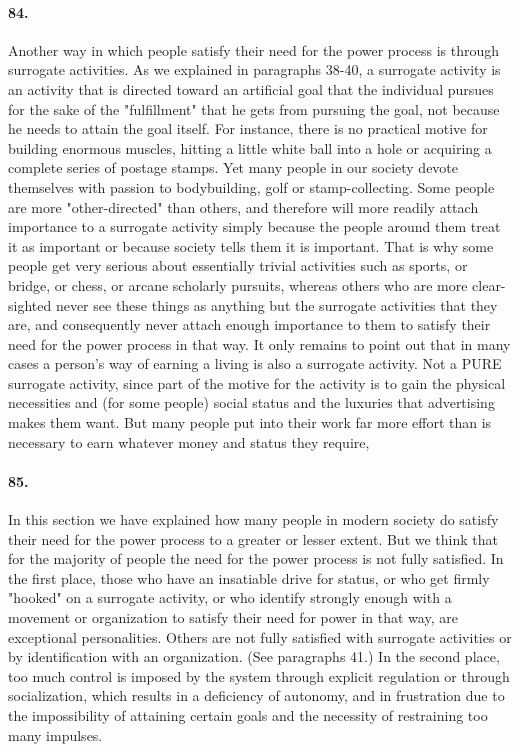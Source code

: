 \documentclass[12pt]{book}
\begin{document}
\paragraph{84.} Another way in which people satisfy their need for the power process is through surrogate activities. As we explained in paragraphs 38-40, a surrogate activity is an activity that is directed toward an artificial goal that the individual pursues for the sake of the "fulfillment" that he gets from pursuing the goal, not because he needs to attain the goal itself. For instance, there is no practical motive for building enormous muscles, hitting a little white ball into a hole or acquiring a complete series of postage stamps. Yet many people in our society devote themselves with passion to bodybuilding, golf or stamp-collecting. Some people are more "other-directed" than others, and therefore will more readily attach importance to a surrogate activity simply because the people around them treat it as important or because society tells them it is important. That is why some people get very serious about essentially trivial activities such as sports, or bridge, or chess, or arcane scholarly pursuits, whereas others who are more clear-sighted never see these things as anything but the surrogate activities that they are, and consequently never attach enough importance to them to satisfy their need for the power process in that way. It only remains to point out that in many cases a person's way of earning a living is also a surrogate activity. Not a PURE surrogate activity, since part of the motive for the activity is to gain the physical necessities and (for some people) social status and the luxuries that advertising makes them want. But many people put into their work far more effort than is necessary to earn whatever money and status they require,


\paragraph{85.}  In this section we have explained how many people in modern society do satisfy their need for the power process to a greater or lesser extent. But we think that for the majority of people the need for the power process is not fully satisfied. In the first place, those who have an insatiable drive for status, or who get firmly "hooked" on a surrogate activity, or who identify strongly enough with a movement or organization to satisfy their need for power in that way, are exceptional personalities. Others are not fully satisfied with surrogate activities or by identification with an organization.  (See paragraphs 41.) In the second place, too much control is imposed by the system through explicit regulation or through socialization, which results in a deficiency of autonomy, and in frustration due to the impossibility of attaining certain goals and the necessity of restraining too many impulses.
\end{document}
